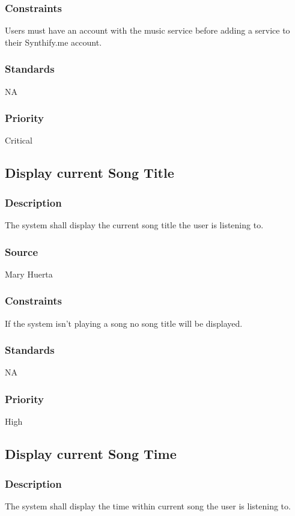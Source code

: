 \subsubsection{Constraints}
Users must have an account with the music service before adding a service to their Synthify.me account.
\subsubsection{Standards}
NA
\subsubsection{Priority}
Critical



\subsection{Display current Song Title}
\subsubsection{Description}
The system shall display the current song title the user is listening to.
\subsubsection{Source}
Mary Huerta
\subsubsection{Constraints}
If the system isn't playing a song no song title will be displayed. 
\subsubsection{Standards}
NA
\subsubsection{Priority}
High



\subsection{Display current Song Time}
\subsubsection{Description}
The system shall display the time within current song the user is listening to.
